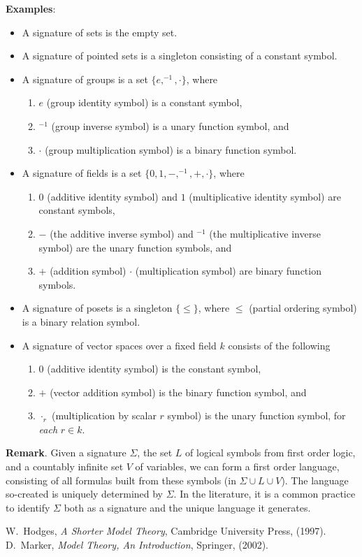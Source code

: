 \documentclass[12pt]{article}
\begin{document}
\textbf{Examples}:
\begin{itemize}
\item A signature of sets is the empty set.
\item A signature of pointed sets is a singleton consisting of a constant symbol.
\item A signature of groups is a set $\lbrace e, ^{-1}, \cdot \rbrace$, where 
\begin{enumerate}
\item $e$ (group identity symbol) is a constant symbol, 
\item $^{-1}$ (group inverse symbol) is a unary function symbol, and 
\item $\cdot$ (group multiplication symbol) is a binary function symbol.
\end{enumerate}
\item A signature of fields is a set $\lbrace 0,1, -, ^{-1}, +, \cdot \rbrace$, where 
\begin{enumerate}
\item $0$ (additive identity symbol) and $1$ (multiplicative identity symbol) are constant symbols, 
\item $-$ (the additive inverse symbol) and $^{-1}$ (the multiplicative inverse symbol) are the unary function symbols, and 
\item $+$ (addition symbol) $\cdot$ (multiplication symbol) are binary function symbols.
\end{enumerate}
\item A signature of posets is a singleton $\lbrace \le \rbrace$, where $\le$ (partial ordering symbol) is a binary relation symbol.
\item A signature of vector spaces over a fixed field $k$ consists of the following
\begin{enumerate}
\item $0$ (additive identity symbol) is the constant symbol,
\item $+$ (vector addition symbol) is the binary function symbol, and
\item $\cdot_r$ (multiplication by scalar $r$ symbol) is the unary function symbol, for \emph{each} $r\in k$.
\end{enumerate}
\end{itemize}

\textbf{Remark}.  Given a signature $\Sigma$, the set $L$ of logical symbols from first order logic, and a countably infinite set $V$ of variables, we can form a first order language, consisting of all formulas built from these symbols (in $\Sigma\cup L\cup V$).  The language so-created is uniquely determined by $\Sigma$.  In the literature, it is a common practice to identify $\Sigma$ both as a signature and the unique language it generates.

\begin{thebibliography}{99}
W.~Hodges, {\it A Shorter Model Theory}, Cambridge University Press, (1997).
D.~Marker, {\it Model Theory, An Introduction}, Springer, (2002).
\end{thebibliography}
\end{document}
